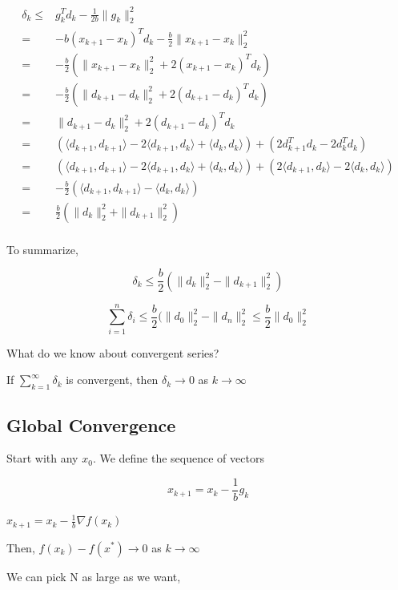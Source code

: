 \documentclass[11pt]{article}
\begin{document}
\begin{subequations}
\label{first:main2}
\begin{align}
\delta_k \leq & g_k^T d_k - \frac{1}{2b} \|g_k\|_2^2\\
= & -b(x_{k + 1} - x_k)^T d_k - \frac{b}{2} \|x_{k + 1} - x_k\|_2^2\\
= & - \frac{b}{2}(\|x_{k + 1} - x_k \|_2^2 + 2(x_{k + 1} - x_k)^T d_k)\\
= & - \frac{b}{2}(\|d_{k + 1} - d_k \|_2^2 + 2(d_{k + 1} - d_k)^T d_k)\\
= & \|d_{k + 1} - d_k\|_2^2 + 2(d_{k + 1} - d_k)^T d_k\\
= & (\langle d_{k + 1}, d_{k + 1} \rangle - 2 \langle d_{k + 1}, d_k \rangle + \langle d_k, d_k \rangle) + (2 d_{k + 1}^T d_k - 2d_k^T d_k)\\
= & (\langle d_{k + 1}, d_{k + 1} \rangle - 2 \langle d_{k + 1}, d_k \rangle + \langle d_k, d_k \rangle) + (2 \langle d_{k + 1}, d_k \rangle - 2 \langle d_k, d_k \rangle)\\
= & - \frac{b}{2}(\langle d_{k + 1}, d_{k + 1} \rangle - \langle d_k, d_k \rangle)\\
= & \frac{b}{2}(\|d_k\|_2^2 + \|d_{k + 1}\|_2^2)\\
\end{align}
\end{subequations}


To summarize,

$$
\delta_k \leq \frac{b}{2} (\|d_k\|_2^2 - \|d_{k + 1}\|_2^2)
$$

$$
\sum_{i = 1}^{n} \delta_i \leq \frac{b}{2} (\|d_0\|_2^2 - \|d_{n}\|_2^2 \leq
\frac{b}{2} \|d_0\|_2^2
$$

What do we know about convergent series?

If \(\sum_{k = 1}^{\infty} \delta_k\) is convergent, then \(\delta_k \to 0\) as \(k
\to \infty\)

\subsection{Global Convergence}
\label{sec:orgace1f76}

Start with any \(x_0\). We define the sequence of vectors

$$x_{k + 1} = x_k - \frac{1}{b} g_k$$

\(x_{k + 1} = x_k - \frac{1}{b} \nabla f(x_k)\)

Then, \(f(x_k) - f(x^*) \to 0\) as \(k \to \infty\)

We can pick N as large as we want,
\end{document}
